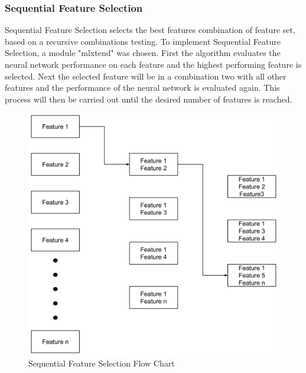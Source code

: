 \documentclass{tum-book}
\begin{document}
        
        \newpage\subsubsection{Sequential Feature Selection}\label{subsubsection:Sequential Feature Selection}
        Sequential Feature Selection selects the best features combination of feature set, based on a recursive combinations testing. To implement Sequential Feature Selection, a module "mlxtend"\cite{raschkas_2018_mlxtend} was chosen. First the algorithm evaluates the neural network performance on each feature and the highest performing feature is selected. Next the selected feature will be in a combination two with all other features and the performance of the neural network is evaluated again. This process will then be carried out until the desired number of features is reached.
        
            \bigskip\begin{figure}[h]
                \centering
                \includegraphics[scale=0.5]{myFiles/myImages/Sequential_Feature_Selection.png}
                \caption{Sequential Feature Selection Flow Chart}
                \label{fig:Sequential Feature Selection Flow Chart}
            \end{figure}
        
\end{document}
